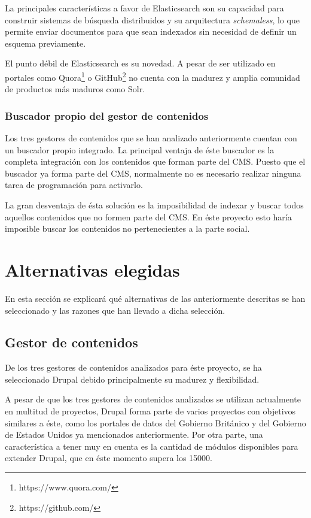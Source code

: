 La principales características a favor de Elasticsearch son su capacidad para construir sistemas de búsqueda distribuidos y su arquitectura \textit{schemaless}, lo que permite enviar documentos para que sean indexados sin necesidad de definir un esquema previamente.

El punto débil de Elasticsearch es su novedad. A pesar de ser utilizado en portales como Quora\footnote{https://www.quora.com/} o GitHub\footnote{https://github.com/} no cuenta con la madurez y amplia comunidad de productos más maduros como Solr.


\subsubsection{Buscador propio del gestor de contenidos}
Los tres gestores de contenidos que se han analizado anteriormente cuentan con un buscador propio integrado.  La principal ventaja de éste buscador es la completa integración con los contenidos que forman parte del CMS.  Puesto que el buscador ya forma parte del CMS, normalmente no es necesario realizar ninguna tarea de programación para activarlo.

La gran desventaja de ésta solución es la imposibilidad de indexar y buscar todos aquellos contenidos que no formen parte del CMS.  En éste proyecto esto haría imposible buscar los contenidos no pertenecientes a la parte social.



\section{Alternativas elegidas}
\label{chapter02:alternativas_seleccionadas}
\label{seccion_alternativas}
En esta sección se explicará qué alternativas de las anteriormente descritas se han seleccionado y las razones que han llevado a dicha selección.

\subsection{Gestor de contenidos}
De los tres gestores de contenidos analizados para éste proyecto, se ha seleccionado Drupal debido principalmente su madurez y flexibilidad.

A pesar de que los tres gestores de contenidos analizados se utilizan actualmente en multitud de proyectos, Drupal forma parte de varios proyectos con objetivos similares a éste, como los portales de datos del Gobierno Británico y del Gobierno de Estados Unidos ya mencionados anteriormente. Por otra parte, una característica a tener muy en cuenta es la cantidad de módulos disponibles para extender Drupal, que en éste momento supera los 15000.

